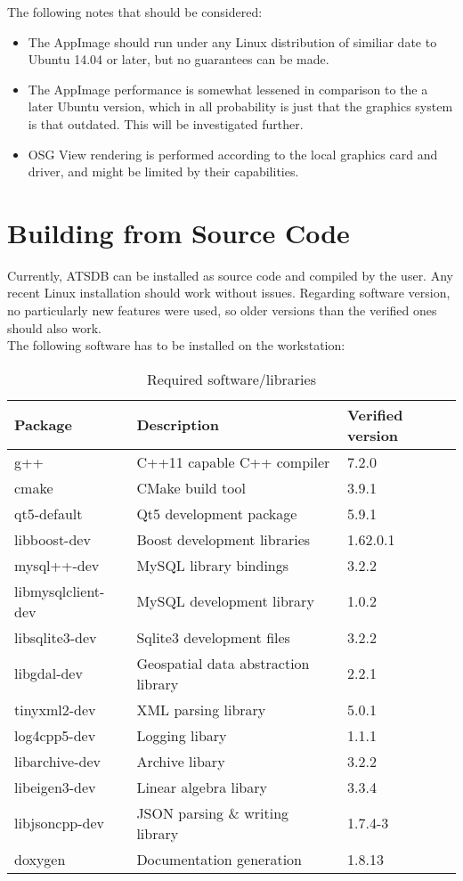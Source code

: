 The following notes that should be considered:

\begin{itemize}  
\item The AppImage should run under any Linux distribution of similiar date to Ubuntu 14.04 or later, but no guarantees can be made.
\item The AppImage performance is somewhat lessened in comparison to the a later Ubuntu version, which in all probability is just that the graphics system is that outdated. This will be investigated further.
\item OSG View rendering is performed according to the local graphics card and driver, and might be limited by their capabilities.
\end{itemize}

\section{Building from Source Code}
Currently, ATSDB can be installed as source code and compiled by the user. Any recent Linux installation should work without issues. Regarding software version, no particularly new features were used, so older versions than the verified ones should also work. \\

The following software has to be installed on the workstation:

\begin{table}[H]
  \center
  \begin{tabular}{ | l | l | l |}
    \hline
    \textbf{Package} & \textbf{Description} & \textbf{Verified version} \\ \hline
    g++ & C++11 capable C++ compiler & 7.2.0 \\ \hline
    cmake & CMake build tool & 3.9.1 \\ \hline
    qt5-default & Qt5 development package & 5.9.1 \\ \hline
    libboost-dev & Boost development libraries & 1.62.0.1 \\ \hline
    mysql++-dev & MySQL library bindings & 3.2.2 \\ \hline
    libmysqlclient-dev & MySQL development library & 1.0.2 \\ \hline
    libsqlite3-dev & Sqlite3 development files & 3.2.2 \\ \hline
    libgdal-dev & Geospatial data abstraction library & 2.2.1 \\ \hline
    tinyxml2-dev & XML parsing library & 5.0.1 \\ \hline
    log4cpp5-dev & Logging libary & 1.1.1 \\ \hline
    libarchive-dev & Archive libary & 3.2.2 \\ \hline
    libeigen3-dev & Linear algebra libary & 3.3.4 \\ \hline
    libjsoncpp-dev & JSON parsing \& writing library & 1.7.4-3 \\ \hline
    doxygen & Documentation generation & 1.8.13 \\ 
    \hline
  \end{tabular}
  \caption{Required software/libraries}
\end{table}

